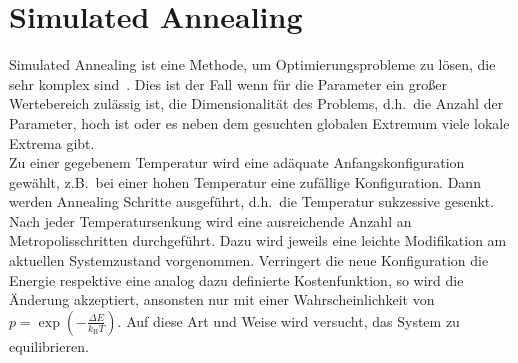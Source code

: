 \section{Simulated Annealing}
Simulated Annealing ist eine Methode, um Optimierungsprobleme zu lösen, die sehr komplex sind~\parencite{nr}. Dies ist der Fall wenn für die Parameter ein großer Wertebereich zulässig ist, die Dimensionalität des Problems, d.h.\ die Anzahl der Parameter, hoch ist oder es neben dem gesuchten globalen Extremum viele lokale Extrema gibt. \\
Zu einer gegebenem Temperatur wird eine adäquate Anfangskonfiguration gewählt, z.B.\ bei einer hohen Temperatur eine zufällige Konfiguration. Dann werden Annealing Schritte ausgeführt, d.h.\ die Temperatur sukzessive gesenkt. Nach jeder Temperatursenkung wird eine ausreichende Anzahl an Metropolisschritten durchgeführt. Dazu wird jeweils eine leichte Modifikation am aktuellen Systemzustand vorgenommen. Verringert die neue Konfiguration die Energie respektive eine analog dazu definierte Kostenfunktion, so wird die Änderung akzeptiert, ansonsten nur mit einer Wahrscheinlichkeit von $p=\exp\left(-\frac{\Delta E}{k_\mathrm{B}T}\right)$. Auf diese Art und Weise wird versucht, das System zu equilibrieren.

